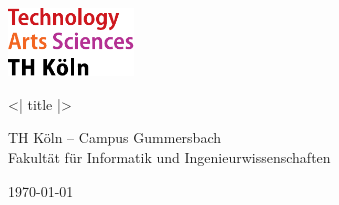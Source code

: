 
\begin{titlepage}

	\includegraphics[width=0.25\textwidth]{../../../assets/logo_th_koeln.pdf}

	\vspace{2cm}
	{\Huge\singlespacing\raggedright <| title |>\par}
	\vspace{1cm}
	{\Large TH Köln – Campus Gummersbach \\ Fakultät für Informatik und Ingenieurwissenschaften\par}

	\vfill

	{\large \today\par}
\end{titlepage}
